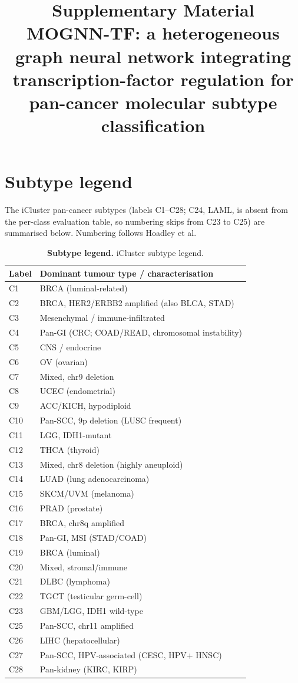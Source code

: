 \documentclass[11pt]{article}
\title{Supplementary Material\\
\large MOGNN-TF: a heterogeneous graph neural network integrating
transcription-factor regulation for pan-cancer molecular subtype
classification}
\author{}
\date{}
\begin{document}
\maketitle

\section*{Subtype legend}
\noindent
The iCluster pan-cancer subtypes (labels C1--C28; C24, LAML, is absent
from the per-class evaluation table, so numbering skips from C23 to C25)
are summarised below. Numbering follows Hoadley et al.

\begin{table}[h]
\centering
\caption*{\textbf{Subtype legend.} iCluster subtype legend.}
\label{tab:subtype_legend}
\small
\begin{tabular}{ll}
\toprule
\textbf{Label} & \textbf{Dominant tumour type / characterisation} \\
\midrule
C1  & BRCA (luminal-related) \\
C2  & BRCA, HER2/ERBB2 amplified (also BLCA, STAD) \\
C3  & Mesenchymal / immune-infiltrated \\
C4  & Pan-GI (CRC; COAD/READ, chromosomal instability) \\
C5  & CNS / endocrine \\
C6  & OV (ovarian) \\
C7  & Mixed, chr9 deletion \\
C8  & UCEC (endometrial) \\
C9  & ACC/KICH, hypodiploid \\
C10 & Pan-SCC, 9p deletion (LUSC frequent) \\
C11 & LGG, IDH1-mutant \\
C12 & THCA (thyroid) \\
C13 & Mixed, chr8 deletion (highly aneuploid) \\
C14 & LUAD (lung adenocarcinoma) \\
C15 & SKCM/UVM (melanoma) \\
C16 & PRAD (prostate) \\
C17 & BRCA, chr8q amplified \\
C18 & Pan-GI, MSI (STAD/COAD) \\
C19 & BRCA (luminal) \\
C20 & Mixed, stromal/immune \\
C21 & DLBC (lymphoma) \\
C22 & TGCT (testicular germ-cell) \\
C23 & GBM/LGG, IDH1 wild-type \\
C25 & Pan-SCC, chr11 amplified \\
C26 & LIHC (hepatocellular) \\
C27 & Pan-SCC, HPV-associated (CESC, HPV+ HNSC) \\
C28 & Pan-kidney (KIRC, KIRP) \\
\bottomrule
\end{tabular}
\end{table}
\end{document}
